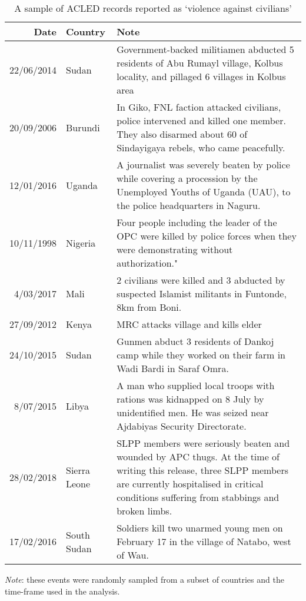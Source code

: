 \documentclass[11pt]{article}
\begin{document}
\begin{table}[H]
	\caption{A sample of ACLED records reported as `violence against civilians'}
	\small
	\begin{tabular*}{1.0\textwidth}{@{\extracolsep{\linewidth minus\linewidth}}rlp{4.0in}}
		\toprule
		Date	&	Country 	& Note	\\[2pt]
		\midrule
		22/06/2014	&	Sudan	&	Government-backed militiamen abducted 5 residents of Abu Rumayl village, Kolbus locality, and pillaged 6 villages in Kolbus area	\\
		20/09/2006	&	Burundi	&	In Giko, FNL faction attacked civilians, police intervened and killed one member. They also disarmed about 60 of Sindayigaya rebels, who came peacefully.	\\
		12/01/2016	&	Uganda	&	A journalist was severely beaten by police while covering a procession by the Unemployed Youths of Uganda (UAU), to the police headquarters in Naguru.	\\
		10/11/1998	&	Nigeria	&	Four people including the leader of the OPC were killed by police forces when they were demonstrating without authorization."	\\
		4/03/2017	&	Mali	&	2 civilians were killed and 3 abducted by suspected Islamist militants in Funtonde, 8km from Boni.	\\
		27/09/2012	&	Kenya	&	MRC attacks village and kills elder	\\
		24/10/2015	&	Sudan	&	Gunmen abduct 3 residents of Dankoj camp while they worked on their farm in Wadi Bardi in Saraf Omra.	\\
		8/07/2015	&	Libya	&	A man who supplied local troops with rations was kidnapped on 8 July by unidentified men. He was seized near Ajdabiyas Security Directorate.	\\
		28/02/2018	&	Sierra Leone	&	SLPP members were seriously beaten and wounded by APC thugs. At the time of writing this release, three SLPP members are currently hospitalised in critical conditions suffering from stabbings and broken limbs.	\\
		17/02/2016	&	South Sudan	&	Soldiers kill two unarmed young men on February 17 in the village of Natabo, west of Wau.	\\
		\bottomrule
	\end{tabular*}
	\begin{flushleft}
		\footnotesize
		\textit{Note}: these events were randomly sampled from a subset of countries and the time-frame used in the analysis.
	\end{flushleft}
\end{table}
\end{document}
